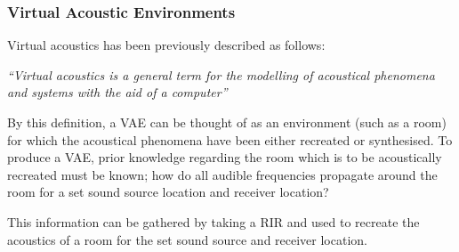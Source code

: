 \documentclass[../../main.tex]{subfiles}
\begin{document}


	\subsubsection{Virtual Acoustic Environments}

		 Virtual acoustics has been previously described \cite{Huopaniemi2000} as follows: 

		 \vspace{5mm}
		 \begin{center}
		 \begin{minipage}{0.5\textwidth}
		 \textit{``Virtual acoustics is a general term for the modelling of acoustical phenomena and systems with the aid of a computer''}
		 \end{minipage}
		 \end{center}
		 \vspace{5mm}

		By this definition, a \ac{VAE} can be thought of as an environment (such as a room) for which the acoustical phenomena have been either recreated or synthesised. To produce a \ac{VAE}, prior knowledge regarding the room which is to be acoustically recreated must be known; how do all audible frequencies propagate around the room for a set sound source location and receiver location?

		This information can be gathered by taking a \ac{RIR} and used to recreate the acoustics of a room for the set sound source and receiver location.




\end{document}
